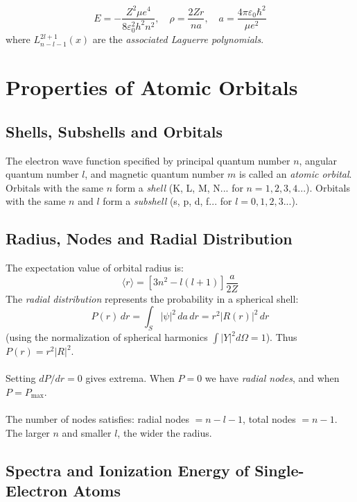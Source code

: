 \[
E = -\frac{Z^2\mu e^4}{8\varepsilon_0^2 h^2 n^2} , \quad \rho = \frac{2Zr}{na}, \quad a = \frac{4\pi\varepsilon_0\hbar^2}{\mu e^2}
\]
where $L_{n-l-1}^{2l+1}(x)$ are the \emph{associated Laguerre polynomials}.

\section{Properties of Atomic Orbitals}

\subsection{Shells, Subshells and Orbitals}

The electron wave function specified by principal quantum number $n$, angular quantum number $l$, and magnetic quantum number $m$ is called an \emph{atomic orbital}.\\
Orbitals with the same $n$ form a \emph{shell} (K, L, M, N... for $n=1,2,3,4...$). Orbitals with the same $n$ and $l$ form a \emph{subshell} (s, p, d, f... for $l=0,1,2,3...$).

\subsection{Radius, Nodes and Radial Distribution}\label{node}

The expectation value of orbital radius is:
\[
\langle r \rangle = \left[3n^2 - l(l+1)\right]\frac{a}{2Z}
\]
The \emph{radial distribution} represents the probability in a spherical shell:
\[
P(r)\,dr = \int_S |\psi|^2\,da\,dr = r^2|R(r)|^2\,dr
\]
(using the normalization of spherical harmonics $\int|Y|^2d\Omega = 1$).
Thus $P(r) = r^2|R|^2$.\\ \\
Setting $dP/dr = 0$ gives extrema. When $P=0$ we have \emph{radial nodes}, and when $P=P_{\text{max}}$.\\ \\
The number of nodes satisfies: radial nodes $= n-l-1$, total nodes $= n-1$.\\
The larger $n$ and smaller $l$, the wider the radius.

\subsection{Spectra and Ionization Energy of Single-Electron Atoms}

